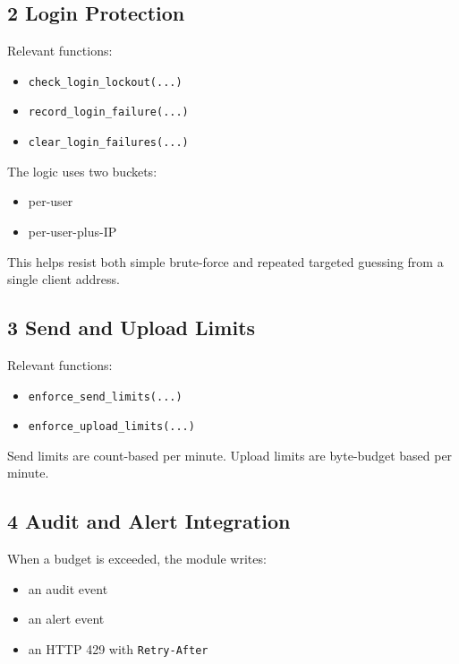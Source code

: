 \documentclass[11pt,a4paper]{article}
\begin{document}
\subsection{2 Login Protection}

Relevant functions:

\begin{itemize}
\item \nolinkurl{check_login_lockout(...)}
\item \nolinkurl{record_login_failure(...)}
\item \nolinkurl{clear_login_failures(...)}
\end{itemize}

The logic uses two buckets:

\begin{itemize}
\item per-user
\item per-user-plus-IP
\end{itemize}

This helps resist both simple brute-force and repeated targeted guessing from a single client address.

\subsection{3 Send and Upload Limits}

Relevant functions:

\begin{itemize}
\item \nolinkurl{enforce_send_limits(...)}
\item \nolinkurl{enforce_upload_limits(...)}
\end{itemize}

Send limits are count-based per minute. Upload limits are byte-budget based per minute.

\subsection{4 Audit and Alert Integration}

When a budget is exceeded, the module writes:

\begin{itemize}
\item an audit event
\item an alert event
\item an HTTP 429 with \nolinkurl{Retry-After}
\end{itemize}
\end{document}
